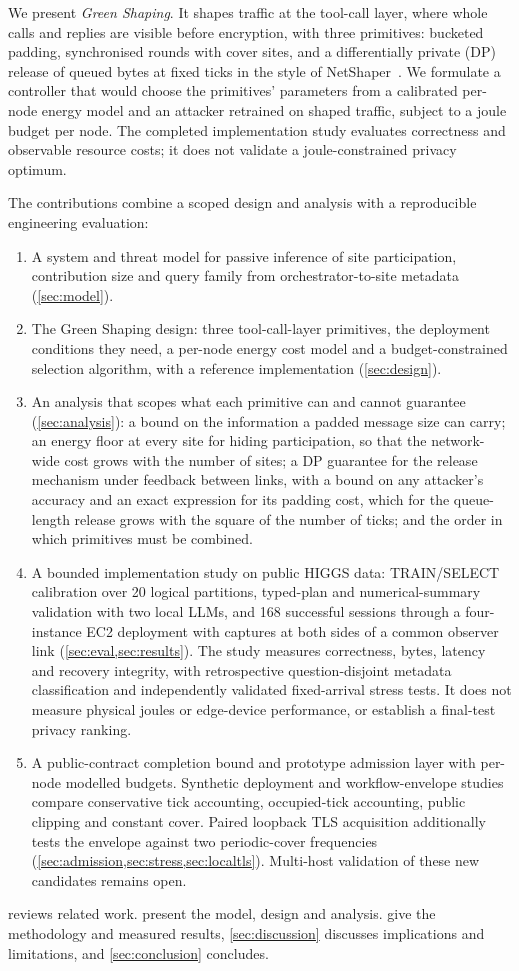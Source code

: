 We present \emph{Green Shaping}. It shapes traffic at the tool-call layer, where whole calls and replies are visible before encryption, with three primitives: bucketed padding, synchronised rounds with cover sites, and a differentially private (DP) release of queued bytes at fixed ticks in the style of NetShaper~\cite{sabzi2024netshaper}. We formulate a controller that would choose the primitives' parameters from a calibrated per-node energy model and an attacker retrained on shaped traffic, subject to a joule budget per node. The completed implementation study evaluates correctness and observable resource costs; it does not validate a joule-constrained privacy optimum.

The contributions combine a scoped design and analysis with a reproducible engineering evaluation:
\begin{enumerate}[label=(\arabic*),leftmargin=*,noitemsep,topsep=2pt]
\item A system and threat model for passive inference of site participation, contribution size and query family from orchestrator-to-site metadata (\cref{sec:model}).
\item The Green Shaping design: three tool-call-layer primitives, the deployment conditions they need, a per-node energy cost model and a budget-constrained selection algorithm, with a reference implementation (\cref{sec:design}).
\item An analysis that scopes what each primitive can and cannot guarantee (\cref{sec:analysis}): a bound on the information a padded message size can carry; an energy floor at every site for hiding participation, so that the network-wide cost grows with the number of sites; a DP guarantee for the release mechanism under feedback between links, with a bound on any attacker's accuracy and an exact expression for its padding cost, which for the queue-length release grows with the square of the number of ticks; and the order in which primitives must be combined.
\item A bounded implementation study on public HIGGS data: TRAIN/SELECT calibration over 20 logical partitions, typed-plan and numerical-summary validation with two local LLMs, and 168 successful sessions through a four-instance EC2 deployment with captures at both sides of a common observer link (\cref{sec:eval,sec:results}). The study measures correctness, bytes, latency and recovery integrity, with retrospective question-disjoint metadata classification and independently validated fixed-arrival stress tests. It does not measure physical joules or edge-device performance, or establish a final-test privacy ranking.
\item A public-contract completion bound and prototype admission layer with per-node modelled budgets. Synthetic deployment and workflow-envelope studies compare conservative tick accounting, occupied-tick accounting, public clipping and constant cover. Paired loopback TLS acquisition additionally tests the envelope against two periodic-cover frequencies (\cref{sec:admission,sec:stress,sec:localtls}). Multi-host validation of these new candidates remains open.
\end{enumerate}

 reviews related work.  present the model, design and analysis.  give the methodology and measured results, \cref{sec:discussion} discusses implications and limitations, and \cref{sec:conclusion} concludes.
